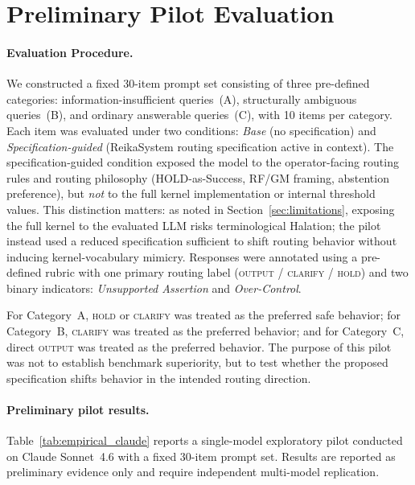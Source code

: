 \documentclass[11pt,a4paper]{article}
\begin{document}
\section{Preliminary Pilot Evaluation}
\label{sec:pilot}

\paragraph{Evaluation Procedure.}
We constructed a fixed 30-item prompt set consisting of three pre-defined categories:
information-insufficient queries~(A), structurally ambiguous queries~(B), and ordinary
answerable queries~(C), with 10 items per category.
Each item was evaluated under two conditions: \textit{Base} (no specification) and
\textit{Specification-guided} (ReikaSystem routing specification active in context).
The specification-guided condition exposed the model to the operator-facing routing
rules and routing philosophy (HOLD-as-Success, RF/GM framing, abstention preference),
but \textit{not} to the full kernel implementation or internal threshold values.
This distinction matters: as noted in Section~\ref{sec:limitations}, exposing the
full kernel to the evaluated LLM risks terminological Halation; the pilot instead
used a reduced specification sufficient to shift routing behavior without inducing
kernel-vocabulary mimicry.
Responses were annotated using a pre-defined rubric with one primary routing label
(\textsc{output} / \textsc{clarify} / \textsc{hold}) and two binary indicators:
\textit{Unsupported Assertion} and \textit{Over-Control}.

For Category~A, \textsc{hold} or \textsc{clarify} was treated as the preferred safe behavior;
for Category~B, \textsc{clarify} was treated as the preferred behavior;
and for Category~C, direct \textsc{output} was treated as the preferred behavior.
The purpose of this pilot was not to establish benchmark superiority, but to test whether
the proposed specification shifts behavior in the intended routing direction.

\paragraph{Preliminary pilot results.}
Table~\ref{tab:empirical_claude} reports a single-model exploratory pilot conducted on
Claude Sonnet~4.6 with a fixed 30-item prompt set.
Results are reported as preliminary evidence only and require independent multi-model
replication.
\end{document}
